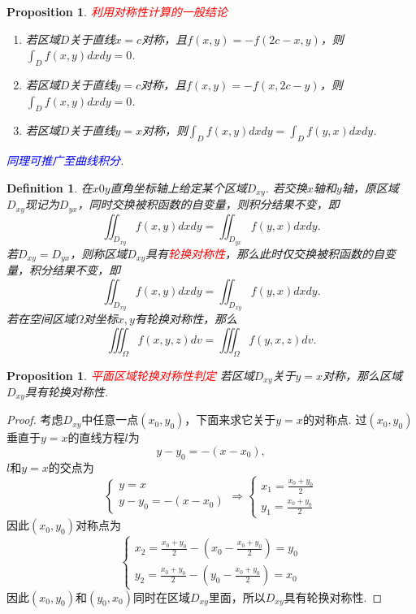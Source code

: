 \documentclass{article}
\newtheorem{proposition}[theorem]{Proposition}
\newtheorem{definition}[theorem]{Definition}
\newcommand{\redt}[1]{\textcolor{red}{#1}}
\newcommand{\bluet}[1]{\textcolor{blue}{#1}}
\begin{document}
\begin{proposition}
\rm \redt{利用对称性计算的一般结论} 
\begin{enumerate}
	\item 若区域$D$关于直线$x = c$对称，且$f(x,y) = -f(2c-x,y)$，则$\int_D f(x,y)dxdy = 0$.
	\item 若区域$D$关于直线$y = c$对称，且$f(x,y) = -f(x,2c-y)$，则$\int_D f(x,y)dxdy = 0$.
	\item 若区域$D$关于直线$y = x$对称，则$\int_D f(x,y)dxdy = \int_D f(y,x)dxdy$.
\end{enumerate}
\bluet{同理可推广至曲线积分}. 
\end{proposition}

\begin{definition}
\rm 在$x0y$直角坐标轴上给定某个区域$D_{xy}$. 若交换$x$轴和$y$轴，原区域$D_{xy}$现记为$D_{yx}$，同时交换被积函数的自变量，则积分结果不变，即
$$
\iint_{D_{xy}} f(x,y)dxdy = \iint_{D_{yx}} f(y,x)dxdy.
$$ 
若$D_{xy} = D_{yx}$，则称区域$D_{xy}$具有\redt{轮换对称性}，那么此时仅交换被积函数的自变量，积分结果不变，即
$$
\iint_{D_{xy}} f(x,y)dxdy = \iint_{D_{xy}} f(y,x)dxdy.
$$
若在空间区域$\Omega$对坐标$x,y$有轮换对称性，那么
$$
\iiint_\Omega f(x,y,z)dv = \iiint_\Omega f(y,x,z)dv.
$$
\end{definition}

\begin{proposition}
\rm \redt{平面区域轮换对称性判定} 若区域$D_{xy}$关于$y = x$对称，那么区域$D_{xy}$具有轮换对称性.
\end{proposition}

\begin{proof}
\rm 考虑$D_{xy}$中任意一点$(x_0,y_0)$，下面来求它关于$y=x$的对称点. 过$(x_0,y_0)$垂直于$y=x$的直线方程$l$为
$$
y-y_0 = -(x-x_0),
$$
$l$和$y=x$的交点为
$$
\left\{
\begin{array}{ll}
y = x\\
y-y_0 = -(x-x_0)
\end{array} \right. \Rightarrow \left\{
\begin{array}{ll}
x_1 = \frac{x_0 + y_0}{2} \\
y_1 = \frac{x_0 + y_0}{2}
\end{array} \right.
$$
因此$(x_0,y_0)$对称点为
$$
\left\{
\begin{array}{ll}
x_2 = \frac{x_0 + y_0}{2} - (x_0 - \frac{x_0 + y_0}{2}) = y_0 \\
y_2 = \frac{x_0 + y_0}{2} - (y_0 - \frac{x_0 + y_0}{2}) = x_0
\end{array} \right.
$$
因此$(x_0,y_0)$和$(y_0,x_0)$同时在区域$D_{xy}$里面，所以$D_{xy}$具有轮换对称性. 
\end{proof}
\end{document}
